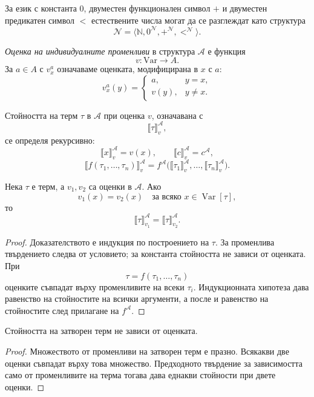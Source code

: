 \begin{example}
За език с константа $0$, двуместен функционален символ $+$ и двуместен предикатен символ $<$ естествените числа могат да се разглеждат като структура
\[
\mathcal N=\langle\mathbb N,0^{\mathcal N},+^{\mathcal N},<^{\mathcal N}\rangle.
\]
\end{example}

\begin{defn}
\emph{Оценка на индивидуалните променливи} в структура $\mathcal A$ е функция
\[
v:\mathrm{Var}\to A.
\]
За $a\in A$ с $v_x^a$ означаваме оценката, модифицирана в $x$ с $a$:
\[
v_x^a(y)=
\begin{cases}
a,&y=x,\\
v(y),&y\ne x.
\end{cases}
\]
\end{defn}

Стойността на терм $\tau$ в $\mathcal A$ при оценка $v$, означавана с
\[
\llbracket\tau\rrbracket^{\mathcal A}_v,
\]
се определя рекурсивно:
\[
\llbracket x\rrbracket^{\mathcal A}_v=v(x),
\qquad
\llbracket c\rrbracket^{\mathcal A}_v=c^{\mathcal A},
\]
\[
\llbracket f(\tau_1,\ldots,\tau_n)\rrbracket^{\mathcal A}_v
=
f^{\mathcal A}\bigl(
\llbracket\tau_1\rrbracket^{\mathcal A}_v,\ldots,
\llbracket\tau_n\rrbracket^{\mathcal A}_v
\bigr).
\]

\begin{prop}
Нека $\tau$ е терм, а $v_1,v_2$ са оценки в $\mathcal A$. Ако
\[
v_1(x)=v_2(x)
\quad\text{за всяко }x\in\operatorname{Var}[\tau],
\]
то
\[
\llbracket\tau\rrbracket^{\mathcal A}_{v_1}
=
\llbracket\tau\rrbracket^{\mathcal A}_{v_2}.
\]
\end{prop}

\begin{proof}
Доказателството е индукция по построението на $\tau$. За променлива твърдението следва от условието; за константа стойността не зависи от оценката. При
\[
\tau=f(\tau_1,\ldots,\tau_n)
\]
оценките съвпадат върху променливите на всеки $\tau_i$. Индукционната хипотеза дава равенство на стойностите на всички аргументи, а после и равенство на стойностите след прилагане на $f^{\mathcal A}$.
\end{proof}

\begin{cor}
Стойността на затворен терм не зависи от оценката.
\end{cor}

\begin{proof}
Множеството от променливи на затворен терм е празно. Всякакви две оценки съвпадат върху това множество. Предходното твърдение за зависимостта само от променливите на терма тогава дава еднакви стойности при двете оценки.
\end{proof}

